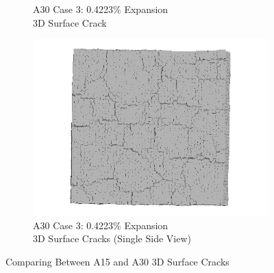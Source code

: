\begin{figure}[ht!]
\begin{subfigure}{.5\textwidth}
    \caption{A30 Case 3: 0.4223\% Expansion\\ 3D Surface Crack}
    \end{subfigure}%
    \begin{subfigure}{.5\textwidth}
      \centering
      \includegraphics[width=.8\linewidth]{Files/exp_3D/ASR/A30P75_3_3ds.png}
    \caption{A30 Case 3: 0.4223\% Expansion\\ 3D Surface Cracks (Single Side View)}
    \end{subfigure}

  \caption{Comparing Between A15 and A30 3D Surface Cracks}
  \label{fig:ASR_A15vsA30P75_3D}
\end{figure}

